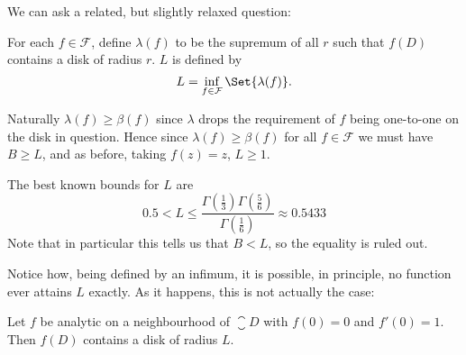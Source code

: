 We can ask a related, but slightly relaxed question:

\begin{definition}
	For each $f \in \mathcal{F}$, define $\lambda(f)$ to be the supremum of all $r$ such that $f(D)$ contains a disk of radius $r$.
	 $L$ is defined by
	\[
		L = \inf_{f \in \mathcal{F}} \Set{\lambda(f)}.
	\]
\end{definition}

\begin{remark}
	Naturally $\lambda(f) \geq \beta(f)$ since $\lambda$ drops the requirement of $f$ being one-to-one on the disk in question.
	Hence since $\lambda(f) \geq \beta(f)$ for all $f \in \mathcal{F}$ we must have $B \geq L$, and as before, taking $f(z) = z$, $L \geq 1$.

	The best known bounds for $L$ are
	\[
		0.5 < L \leq \frac{\Gamma(\frac{1}{3}) \Gamma(\frac{5}{6})}{\Gamma(\frac{1}{6})} \approx 0.5433
	\]
	Note that in particular this tells us that $B < L$, so the equality is ruled out.
\end{remark}

Notice how, being defined by an infimum, it is possible, in principle, no function ever attains $L$ exactly.
As it happens, this is not actually the case:

\begin{proposition}\label{prop9.6}
	Let $f$ be analytic on a neighbourhood of $\closure{D}$ with $f(0) = 0$ and $f'(0) = 1$.
	Then $f(D)$ contains a disk of radius $L$.
\end{proposition}

